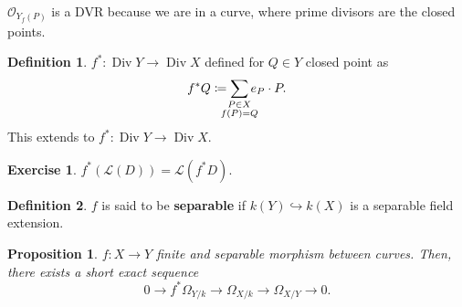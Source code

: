 \documentclass[12pt]{article}
\DeclareMathOperator{\Div}{Div}
\newtheorem*{proposition}{Proposition}
\theoremstyle{definition}
\newtheorem*{definition}{Definition}
\newtheorem*{exercise}{Exercise}
\begin{document}
$\mathcal O_{Y_f(P)}$ is a DVR because we are in a curve, where prime divisors are the closed points.

\begin{definition}
$f^*:\Div Y\longrightarrow\Div X$ defined for $Q\in Y$ closed point as
\[f^*Q\coloneqq\sum_{\mathclap{\substack{P\in X\\f(P)=Q}}}e_P\cdot P.\]
This extends to $f^*:\Div Y\rightarrow\Div X$.
\end{definition}

\begin{exercise}
$f^*(\mathcal L(D))=\mathcal L(f^*D)$.
\end{exercise}

\begin{definition}
$f$ is said to be \textbf{separable} if $k(Y)\hookrightarrow k(X)$ is a separable field extension.
\end{definition}

\begin{proposition}
$f:X\rightarrow Y$ finite and separable morphism between curves. Then, there exists a short exact sequence
\[0\longrightarrow f^*\Omega_{Y/k}\longrightarrow\Omega_{X/k}\longrightarrow\Omega_{X/Y}\rightarrow0.\]
\end{proposition}
\end{document}
